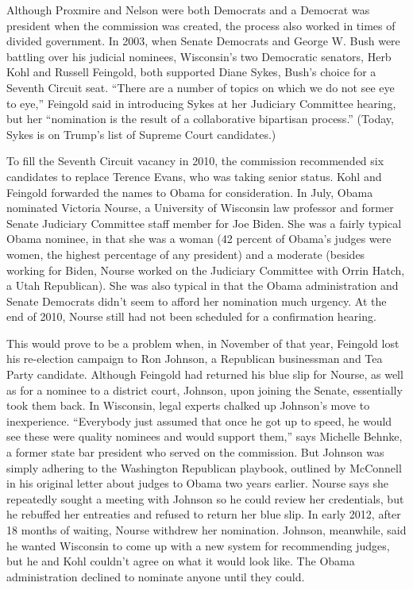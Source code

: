 Although Proxmire and Nelson were both Democrats and a Democrat was
president when the commission was created, the process also worked in
times of divided government. In 2003, when Senate Democrats and George
W. Bush were battling over his judicial nominees, Wisconsin's two
Democratic senators, Herb Kohl and Russell Feingold, both supported
Diane Sykes, Bush's choice for a Seventh Circuit seat. ``There are a
number of topics on which we do not see eye to eye,'' Feingold said in
introducing Sykes at her Judiciary Committee hearing, but her
``nomination is the result of a collaborative bipartisan process.''
(Today, Sykes is on Trump's list of Supreme Court candidates.)

To fill the Seventh Circuit vacancy in 2010, the commission recommended
six candidates to replace Terence Evans, who was taking senior status.
Kohl and Feingold forwarded the names to Obama for consideration. In
July, Obama nominated Victoria Nourse, a University of Wisconsin law
professor and former Senate Judiciary Committee staff member for Joe
Biden. She was a fairly typical Obama nominee, in that she was a woman
(42 percent of Obama's judges were women, the highest percentage of any
president) and a moderate (besides working for Biden, Nourse worked on
the Judiciary Committee with Orrin Hatch, a Utah Republican). She was
also typical in that the Obama administration and Senate Democrats
didn't seem to afford her nomination much urgency. At the end of 2010,
Nourse still had not been scheduled for a confirmation hearing.

This would prove to be a problem when, in November of that year,
Feingold lost his re-election campaign to Ron Johnson, a Republican
businessman and Tea Party candidate. Although Feingold had returned his
blue slip for Nourse, as well as for a nominee to a district court,
Johnson, upon joining the Senate, essentially took them back. In
Wisconsin, legal experts chalked up Johnson's move to inexperience.
``Everybody just assumed that once he got up to speed, he would see
these were quality nominees and would support them,'' says Michelle
Behnke, a former state bar president who served on the commission. But
Johnson was simply adhering to the Washington Republican playbook,
outlined by McConnell in his original letter about judges to Obama two
years earlier. Nourse says she repeatedly sought a meeting with Johnson
so he could review her credentials, but he rebuffed her entreaties and
refused to return her blue slip. In early 2012, after 18 months of
waiting, Nourse withdrew her nomination. Johnson, meanwhile, said he
wanted Wisconsin to come up with a new system for recommending judges,
but he and Kohl couldn't agree on what it would look like. The Obama
administration declined to nominate anyone until they could.

